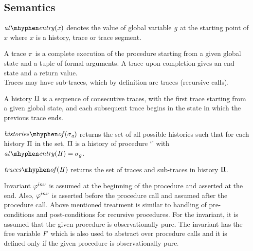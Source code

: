 \subsection{Semantics}

\begin{definition} 
  $\\\atEntry{x}$ denotes the value of global variable $\textit{g}$ at the
  starting point of $x$ where $x$ is a history, trace or trace
  segment.
\end{definition}

\begin{definition}[trace]
  A trace $\pi$ is a complete execution of the procedure starting
  from a given global state and a tuple of formal arguments. A trace
  upon completion gives an end state and a return value.\\ Traces may
  have sub-traces, which by definition are traces (recursive calls).
\end{definition}

\begin{definition}[history]
  A history $\Pi$ is a sequence of consecutive traces, with the
  first trace starting from a given global state, and each subsequent
  trace begins in the state in which the previous trace ends.
\end{definition}

\begin{definition} 
  $\historyOf{\gmap}$ returns the set of all possible histories such
  that for each history $\Pi$ in the set, $\Pi$ is a history
  of procedure `\foo' with $\atEntry{\history} = \gmap$.
\end{definition}

\begin{definition} $\tracesOf{\history}$ returns the set of traces and
  sub-traces in history $\Pi$.
\end{definition}

Invariant $\varphi^{inv}$ is assumed at the beginning of the procedure and
asserted at the end. Also, $\varphi^{inv}$ is asserted before the procedure
call and assumed after the procedure call. Above mentioned treatment
is similar to handling of pre-conditions and post-conditions for
recursive procedures. For the invariant, it is assumed that the given
procedure is observationally pure. The invariant has the free variable
$\mathit{F}$ which is also used to abstract over procedure calls and it is
defined only if the given procedure is observationally pure.

